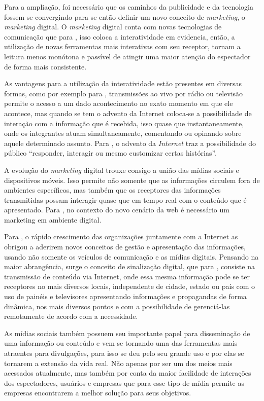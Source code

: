 Para a ampliação, foi necessário que os caminhos da publicidade e da tecnologia fossem se convergindo para se então definir um novo conceito de \textit{marketing}, o \textit{marketing} digital. O \textit{marketing} digital conta com novas tecnologias de comunicação que para \cite[p.2]{escobar2007}, isso coloca a interatividade em evidencia, então, a utilização de novas ferramentas mais interativas com seu receptor, tornam a leitura menos monótona e passível de atingir uma maior atenção do espectador de forma mais consistente.  

As vantagens para a utilização da interatividade estão presentes em diversas formas, como por exemplo para \cite[p.4]{escobar2007}, transmissões ao vivo por rádio ou televisão permite o acesso a um dado acontecimento no exato momento em que ele acontece, mas quando se tem o advento da Internet coloca-se a possibilidade de interação com a informação que é recebida, isso quase que instantaneamente, onde os integrantes atuam simultaneamente, comentando ou opinando sobre aquele determinado assunto. Para \cite{deuze2002}, o advento da \textit{Internet} traz a possibilidade do público ``responder, interagir ou mesmo customizar certas histórias''. 

A evolução do \textit{marketing} digital trouxe consigo a união das mídias sociais e dispositivos móveis. Isso permite não somente que as informações circulem fora de ambientes específicos, mas também que os receptores das informações transmitidas possam interagir quase que em tempo real com o conteúdo que é apresentado. Para \cite{santos2014}, no contexto do novo cenário da web é necessário um marketing em ambiente digital.

Para \cite[p.7]{machado2010}, o rápido crescimento das organizações juntamente com a Internet as obrigou a aderirem novos conceitos de gestão e apresentação das informações, usando não somente os veículos de comunicação e as mídias digitais. Pensando na maior abrangência, surge o conceito de sinalização digital, que para \cite[p.37]{machado2010}, consiste na transmissão de conteúdo via Internet, onde essa mesma informação pode se ter receptores no mais diversos locais, independente de cidade, estado ou país com o uso de painéis e televisores apresentando informações e propagandas de forma dinâmica, nos mais diversos pontos e com a possibilidade de gerenciá-las remotamente de acordo com a necessidade. 

As mídias sociais também possuem seu importante papel para disseminação de uma informação ou conteúdo e vem se tornando uma das ferramentas mais atraentes para divulgações, para \cite{rosa2010} isso se deu pelo seu grande uso e por elas se tornarem a extensão da vida real. Não apenas por ser um dos meios mais acessados atualmente, mas também por conta da maior facilidade de interações dos espectadores, usuários e empresas que para \cite{rosa2010} esse tipo de mídia permite as empresas encontrarem a melhor solução para seus objetivos. 

